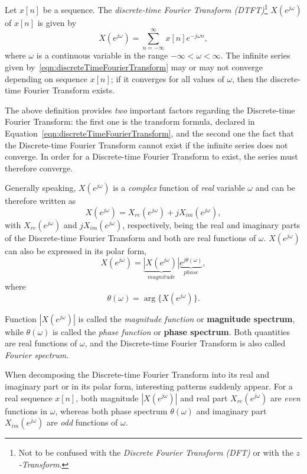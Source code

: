 \documentclass[\documentfontsize, twocolumn]{\classname}
\begin{document}
\begin{defin}
    Let $x[n]$ be a sequence. The \emph{discrete-time Fourier Transform (DTFT)}\footnote{Not to be confused with the \emph{Discrete Fourier Transform (DFT)} or with the \emph{$z$-Transform}.} $X(e^{j\omega})$ of $x[n]$ is given by
    \begin{equation}\label{eqn:discreteTimeFourierTransform}
        X(e^{j\omega}) = \sum_{n=-\infty}^\infty x[n] e^{-j\omega n},
    \end{equation}
    where $\omega$ is a continuous variable in the range $-\infty < \omega < \infty$.
The infinite series given by~\ref{eqn:discreteTimeFourierTransform} may or may not converge depending on sequence $x[n]$; if it converges for all values of $\omega$, then the discrete-time Fourier Transform exists.
\end{defin}

The above definition provides \emph{two} important factors regarding the
Discrete-time Fourier Transform: the first one is the transform formula,
declared in Equation~\ref{eqn:discreteTimeFourierTransform}, and the second one
the fact that the Discrete-time Fourier Transform cannot exist if the infinite
series does not converge. In order for a Discrete-time Fourier Transform to
exist, the series must therefore converge.

Generally speaking, $X(e^{j\omega})$ is a \emph{complex} function of \emph{real} variable $\omega$ and can be therefore written as
\[
    X(e^{j\omega}) = X_{re}(e^{j\omega}) + jX_{im}(e^{j\omega}),
\]
with $X_{re}(e^{j\omega})$ and $jX_{im}(e^{j\omega})$, respectively, being the real and imaginary parts of the Discrete-time Fourier Transform and both are real functions of $\omega$. $X(e^{j\omega})$ can also be expressed in its polar form,
\[
    X(e^{j\omega}) = \underbrace{\left|X(e^{j\omega})\right|}_{magnitude}\underbrace{e^{j\theta(\omega)}}_{phase},
\]
where \[\theta(\omega) = \arg\{X(e^{j\omega})\}.\]

Function $\left|X(e^{j\omega})\right|$ is called the \emph{magnitude function} or \textbf{magnitude spectrum}, while $\theta(\omega)$ is called the \emph{phase function} or \textbf{phase spectrum}. Both quantities are real functions of $\omega$, and the Discrete-time Fourier Transform is also called \emph{Fourier spectrum}.

When decomposing the Discrete-time Fourier Transform into its real and imaginary part or in its polar form, interesting patterns suddenly appear. For a real sequence $x[n]$, both magnitude $\left|X(e^{j\omega})\right|$ and real part $X_{re}(e^{j\omega})$ are \emph{even} functions in $\omega$, whereas both phase spectrum $\theta(\omega)$ and imaginary part $X_{im}(e^{j\omega})$ are \emph{odd} functions of $\omega$.
\end{document}
